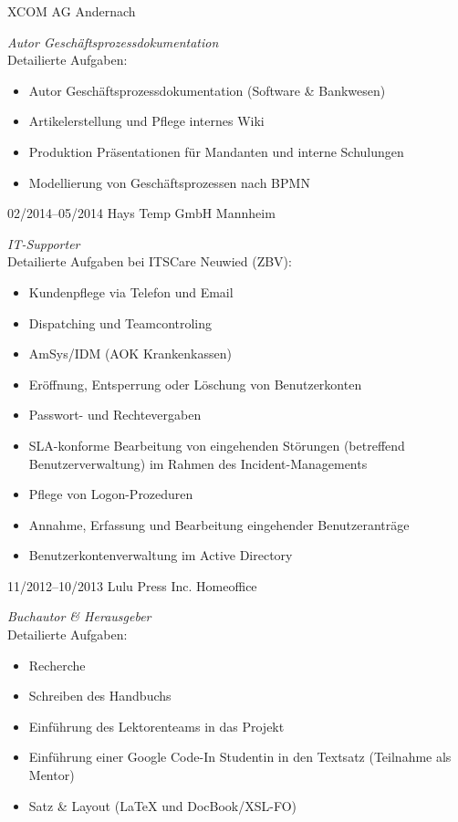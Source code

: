 \documentclass[a4paper,latin]{friggeri-cv} %
\begin{document}
\begin{entrylist}
{XCOM AG}
{Andernach}
{\emph{Autor Geschäftsprozessdokumentation} \\
	Detailierte Aufgaben:
	\begin{itemize}
		\item Autor Geschäftsprozessdokumentation (Software  \& Bankwesen)
		\item Artikelerstellung und Pflege internes Wiki
		\item Produktion Präsentationen für Mandanten und interne Schulungen
		\item Modellierung von Geschäftsprozessen nach BPMN
	\end{itemize}
}
\entry
{02/2014--05/2014}
{Hays Temp GmbH}
{Mannheim}
{\emph{IT-Supporter} \\
Detailierte Aufgaben bei ITSCare Neuwied (ZBV):
\begin{itemize}
\item Kundenpflege via Telefon und Email
\item Dispatching und Teamcontroling
\item AmSys/IDM (AOK Krankenkassen)
\item Eröffnung, Entsperrung oder Löschung von Benutzerkonten
\item Passwort- und Rechtevergaben
\item SLA-konforme Bearbeitung von eingehenden Störungen (betreffend Benutzerverwaltung) im Rahmen des Incident-Managements
\item Pflege von Logon-Prozeduren
\item Annahme, Erfassung und Bearbeitung eingehender Benutzeranträge
\item Benutzerkontenverwaltung im Active Directory
\end{itemize}
}
\entry
{11/2012--10/2013}
{Lulu Press Inc.}
{Homeoffice}
{\emph{Buchautor \& Herausgeber}\\
Detailierte Aufgaben:
\begin{itemize}
\item Recherche
\item Schreiben des Handbuchs
\item Einführung des Lektorenteams in das Projekt
\item Einführung einer Google Code-In Studentin in den Textsatz (Teilnahme als Mentor)
\item Satz \& Layout (\LaTeX{} und DocBook/XSL-FO)

\end{itemize}}
\end{entrylist}
\end{document}
